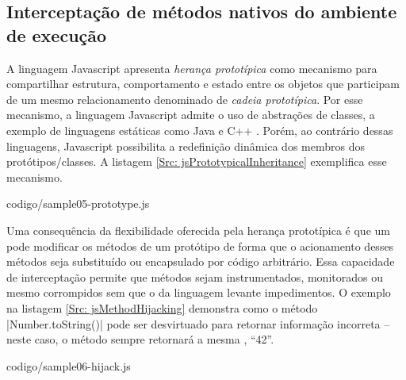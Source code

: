 \subsection{Interceptação de métodos nativos do ambiente de execução}

A linguagem Javascript apresenta \textit{herança prototípica} como mecanismo para compartilhar estrutura, comportamento e estado entre os objetos que participam de um mesmo relacionamento denominado de \textit{cadeia prototípica}. Por esse mecanismo, a linguagem Javascript admite o uso de abstrações de classes, a exemplo de linguagens estáticas como Java e C++ \cite[seção 4.2.1]{ECMA2017}. Porém, ao contrário dessas linguagens, Javascript possibilita a redefinição dinâmica dos membros dos protótipos/classes. A listagem \ref{Src: jsPrototypicalInheritance} exemplifica esse mecanismo.



	{codigo/sample05-prototype.js}

Uma consequência da flexibilidade oferecida pela herança prototípica é que um {\script} pode modificar os métodos de um protótipo de forma que o acionamento desses métodos seja substituído ou encapsulado por código arbitrário. Essa capacidade de interceptação permite que métodos sejam instrumentados, monitorados ou mesmo corrompidos sem que o  da linguagem levante impedimentos. O exemplo na listagem \ref{Src: jsMethodHijacking} demonstra como o método |Number.toString()| pode ser desvirtuado para retornar informação incorreta -- neste caso, o método sempre retornará a mesma , ``42''.


	{codigo/sample06-hijack.js}

